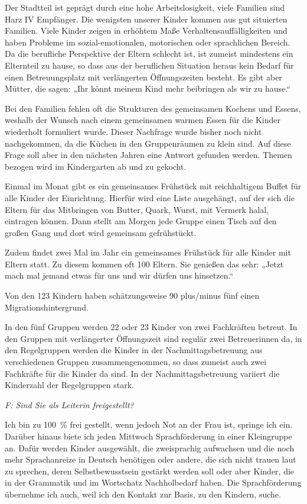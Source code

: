 Der Stadtteil ist geprägt durch eine hohe Arbeitslosigkeit, viele Familien sind Harz IV Empfänger. Die wenigsten unserer Kinder kommen aus gut situierten Familien. Viele Kinder zeigen in erhöhtem Maße Verhaltensauffälligkeiten und haben Probleme im sozial-emotionalen, motorischen oder sprachlichen Bereich. Da die berufliche Perspektive der Eltern schlecht ist, ist zumeist mindestens ein Elternteil zu hause, so dass aus der beruflichen Situation heraus kein Bedarf für einen Betreuungsplatz mit verlängerten Öffnungszeiten besteht. Es gibt aber Mütter, die sagen: „Ihr könnt meinem Kind mehr beibringen als wir zu hause.“
 
Bei den Familien fehlen oft die Strukturen des gemeinsamen Kochens und Essens, weshalb der Wunsch nach einem gemeinsamen warmen Essen für die Kinder wiederholt formuliert wurde. Dieser Nachfrage wurde bisher noch nicht nachgekommen, da die Küchen in den Gruppenräumen zu klein sind. Auf diese Frage soll aber in den nächsten Jahren eine Antwort gefunden werden. Themen bezogen wird im Kindergarten ab und zu gekocht. 

Einmal im Monat gibt es ein gemeinsames Frühstück mit reichhaltigem Buffet für alle Kinder der Einrichtung. Hierfür wird eine Liste ausgehängt, auf der sich die Eltern für das Mitbringen von Butter, Quark, Wurst, mit Vermerk halal, eintragen können. Dann stellt am Morgen jede Gruppe einen Tisch auf den großen Gang und dort wird gemeinsam gefrühstückt.

Zudem findet zwei Mal im Jahr ein gemeinsames Frühstück für alle Kinder mit Eltern statt. Zu diesem kommen oft 100 Eltern. Sie genießen das sehr: „Jetzt mach mal jemand etwas für uns und wir dürfen uns hinsetzen.“

Von den 123 Kindern haben schätzungsweise 90 plus/minus fünf einen Migrationshintergrund.

In den fünf Gruppen werden 22 oder 23 Kinder von zwei Fachkräften betreut. In den Gruppen mit verlängerter Öffnungszeit sind regulär zwei Betreuerinnen da, in den Regelgruppen werden die Kinder in der Nachmittagsbetreuung aus verschiedenen Gruppen zusammengenommen, so dass zumeist auch zwei Fachkräfte für die Kinder da sind. In der Nachmittagsbetreuung variiert die Kinderzahl der Regelgruppen stark.

\emph{F: Sind Sie als Leiterin freigestellt?}	

Ich bin zu 100~\% frei gestellt, wenn jedoch Not an der Frau ist, springe ich ein. 
Darüber hinaus biete ich jeden Mittwoch Sprachförderung in einer Kleingruppe an. Dafür werden Kinder ausgewählt, die zweisprachig aufwachsen und die noch mehr Sprachanreize in Deutsch benötigen oder andere, die sich nicht trauen laut zu sprechen, deren Selbstbewusstsein gestärkt werden soll oder aber Kinder, die in der Grammatik und im Wortschatz Nachholbedarf haben.
Die Sprachförderung übernehme ich auch, weil ich den Kontakt zur Basis, zu den Kindern, suche.

